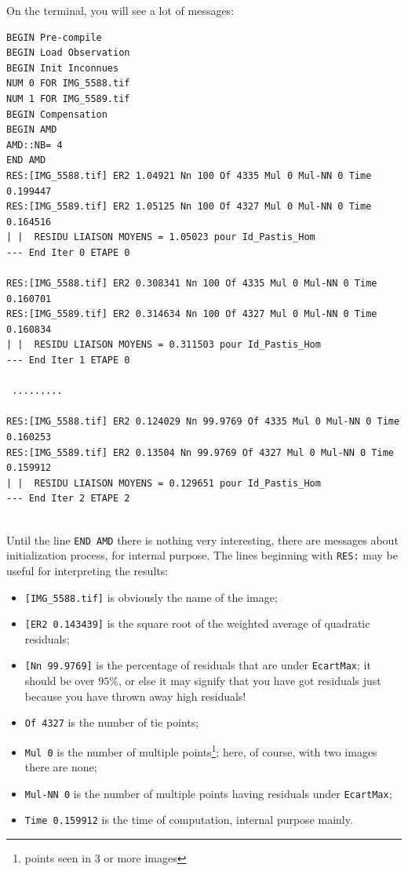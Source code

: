 On the terminal, you will see a lot of messages:

{\scriptsize
\begin{verbatim}
BEGIN Pre-compile
BEGIN Load Observation
BEGIN Init Inconnues
NUM 0 FOR IMG_5588.tif
NUM 1 FOR IMG_5589.tif
BEGIN Compensation
BEGIN AMD
AMD::NB= 4
END AMD
RES:[IMG_5588.tif] ER2 1.04921 Nn 100 Of 4335 Mul 0 Mul-NN 0 Time 0.199447
RES:[IMG_5589.tif] ER2 1.05125 Nn 100 Of 4327 Mul 0 Mul-NN 0 Time 0.164516
| |  RESIDU LIAISON MOYENS = 1.05023 pour Id_Pastis_Hom
--- End Iter 0 ETAPE 0

RES:[IMG_5588.tif] ER2 0.308341 Nn 100 Of 4335 Mul 0 Mul-NN 0 Time 0.160701
RES:[IMG_5589.tif] ER2 0.314634 Nn 100 Of 4327 Mul 0 Mul-NN 0 Time 0.160834
| |  RESIDU LIAISON MOYENS = 0.311503 pour Id_Pastis_Hom
--- End Iter 1 ETAPE 0

 .........

RES:[IMG_5588.tif] ER2 0.124029 Nn 99.9769 Of 4335 Mul 0 Mul-NN 0 Time 0.160253
RES:[IMG_5589.tif] ER2 0.13504 Nn 99.9769 Of 4327 Mul 0 Mul-NN 0 Time 0.159912
| |  RESIDU LIAISON MOYENS = 0.129651 pour Id_Pastis_Hom
--- End Iter 2 ETAPE 2


\end{verbatim}
}

Until the line {\tt END AMD} there is nothing very interesting, there
are messages about initialization process, for internal purpose.
The lines beginning with {\tt RES:} may be useful for interpreting the results:

\begin{itemize}
    \item {\tt [IMG\_5588.tif]} is obviously the name of the image;

    \item {\tt [ER2 0.143439]} is the square root of the weighted average of quadratic residuals;

    \item {\tt [Nn 99.9769]} is the percentage of residuals that are under {\tt EcartMax};
          it should be over $95\%$, or else it may signify that you have got residuals just
          because you have thrown away high residuals!

    \item {\tt Of 4327} is the number of tie points;
    \item {\tt Mul 0} is the number of multiple points\footnote{points seen in $3$ or more images};
          here, of course, with two images there are none;

    \item {\tt Mul-NN 0} is the number of multiple points having residuals under {\tt EcartMax};

        \item {\tt Time 0.159912} is the time of computation, internal purpose mainly.
\end{itemize}

